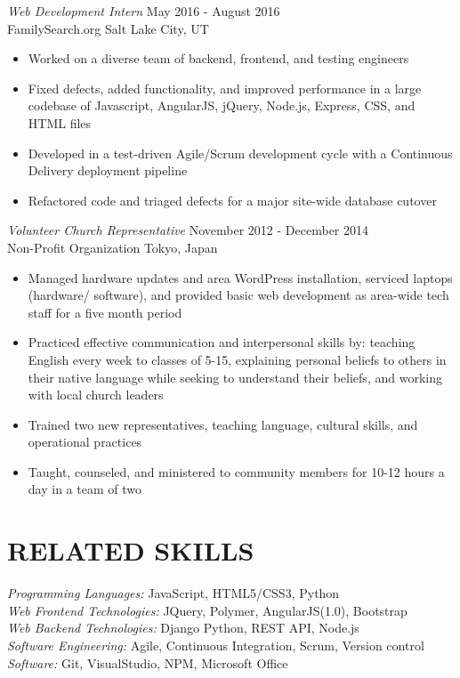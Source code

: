 \documentclass[10pt, resumewidth=7in]{res} %
\begin{document}
\begin{resume}
{\sl Web Development Intern} \hfill May 2016 - August 2016 \\
FamilySearch.org \hfill Salt Lake City, UT
\begin{itemize} \itemsep -2pt %
\item Worked on a diverse team of backend, frontend, and testing engineers
\item Fixed defects, added functionality, and improved performance in a large codebase of Javascript, AngularJS,  jQuery, Node.js, Express, CSS, and HTML files
\item Developed in a test-driven Agile/Scrum development cycle with a Continuous Delivery deployment pipeline
\item Refactored code and triaged defects for a major site-wide database cutover
\end{itemize}

{\sl Volunteer Church Representative} \hfill November 2012 - December 2014 \\
Non-Profit Organization \hfill Tokyo, Japan
\begin{itemize} \itemsep -2pt %
\item Managed hardware updates and area WordPress installation, serviced laptops (hardware/ software), and provided basic web development as area-wide tech staff for a five month period
\item Practiced effective communication and interpersonal skills by: teaching English every week to classes of 5-15, explaining personal beliefs to others in their native language while seeking to understand their beliefs, and working with local church leaders
\item Trained two new representatives, teaching language, cultural skills, and operational practices
\item Taught, counseled, and ministered to community members for 10-12 hours a day in a team of two
\end{itemize}


\section{RELATED SKILLS}
{\sl Programming Languages:} JavaScript, HTML5/CSS3, Python \\
{\sl Web Frontend Technologies:} JQuery, Polymer, AngularJS(1.0), Bootstrap \\
{\sl Web Backend Technologies:} Django Python, REST API, Node.js \\
{\sl Software Engineering:} Agile, Continuous Integration, Scrum, Version control \\
{\sl Software:} Git, VisualStudio, NPM, Microsoft Office


\end{resume}
\end{document}
